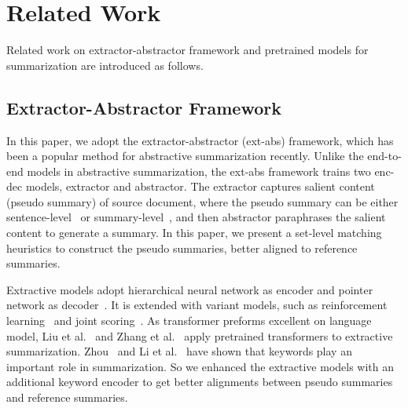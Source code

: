 \section{Related Work}
\label{sec:related}
Related work on extractor-abstractor framework and pretrained models for summarization are introduced as follows.
\subsection{Extractor-Abstractor Framework}
In this paper, we adopt the extractor-abstractor (ext-abs) framework, which has been
a popular method for abstractive summarization recently.
Unlike the end-to-end models
\cite{NallapatiZSGX16,SeeLM17,LiuLZ18,BART19,ProNet20} 
in abstractive summarization,
the ext-abs framework trains two enc-dec models, extractor and abstractor.
The extractor captures salient content (pseudo summary) of source document, 
where the pseudo summary can be either sentence-level~\cite{TanWX17, hsu18,FastAbs18}
or summary-level~\cite{summlevel19, SharmaHHW19},
and then abstractor paraphrases the salient content to generate a summary. 
In this paper, we present a set-level matching heuristics to construct the pseudo summaries, better aligned to reference summaries.


Extractive models adopt hierarchical neural network as encoder
and pointer network as decoder~\cite{Cheng16,NallapatiAAAI17}.
It is extended with variant models, 
such as reinforcement learning~\cite{NarayanCL18} and
joint scoring~\cite{score18}. 
As transformer preforms excellent on language model, 
Liu et al.~ and Zhang et al.~ 
apply pretrained transformers to extractive summarization.
Zhou~\cite{ZhouYWZ17} and Li et al.~ have shown that keywords play an important role in summarization.
So we enhanced the extractive models with an additional keyword encoder to get better alignments between pseudo summaries and reference summaries.


